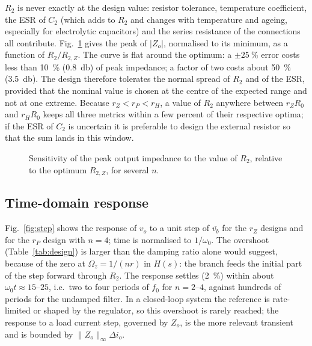 \documentclass[11pt,a4paper]{article}
\begin{document}
$R_2$ is never exactly at the design value: resistor tolerance, temperature coefficient,
the ESR of $C_2$ (which adds to $R_2$ and changes with temperature and ageing, especially
for electrolytic capacitors) and the series resistance of the connections all contribute.
Fig.~\ref{fig:sens} gives the peak of $|Z_o|$, normalised to its minimum, as a function of
$R_2/R_{2,Z}$. The curve is flat around the optimum: a $\pm\SI{25}{\percent}$ error costs
less than \SI{10}{\percent} (\SI{0.8}{\decibel}) of peak impedance; a factor of two costs
about \SI{50}{\percent} (\SI{3.5}{\decibel}). The design therefore tolerates the normal
spread of $R_2$ and of the ESR, provided that the nominal value is chosen at the centre of
the expected range and not at one extreme. Because $r_Z < r_P < r_H$, a value of $R_2$
anywhere between $r_Z R_0$ and $r_H R_0$ keeps all three metrics within a few percent of
their respective optima; if the ESR of $C_2$ is uncertain it is preferable to design the
external resistor so that the sum lands in this window.

\begin{figure}[htb]
\centering
{}
\caption{Sensitivity of the peak output impedance to the value of $R_2$, relative to the
optimum $R_{2,Z}$, for several $n$.}
\label{fig:sens}
\end{figure}

\subsection{Time-domain response}

Fig.~\ref{fig:step} shows the response of $v_o$ to a unit step of $\overline{v_b}$ for the
$r_Z$ designs and for the $r_P$ design with $n = 4$; time is normalised to $1/\omega_0$.
The overshoot (Table~\ref{tab:design}) is larger than the damping ratio alone would
suggest, because of the zero at $\Omega_z = 1/(n r)$ in $H(s)$: the branch feeds the
initial part of the step forward through $R_2$. The response settles (\SI{2}{\percent}) within
about $\omega_0 t \approx 15$--$25$, i.e.\ two to four periods of $f_0$ for $n = 2$--$4$,
against hundreds of periods for the undamped filter. In a closed-loop system the reference is rate-limited or shaped by the regulator,
so this overshoot is rarely reached; the response to a load current step, governed by
$Z_o$, is the more relevant transient and is bounded by $\|Z_o\|_\infty \Delta i_o$.
\end{document}
